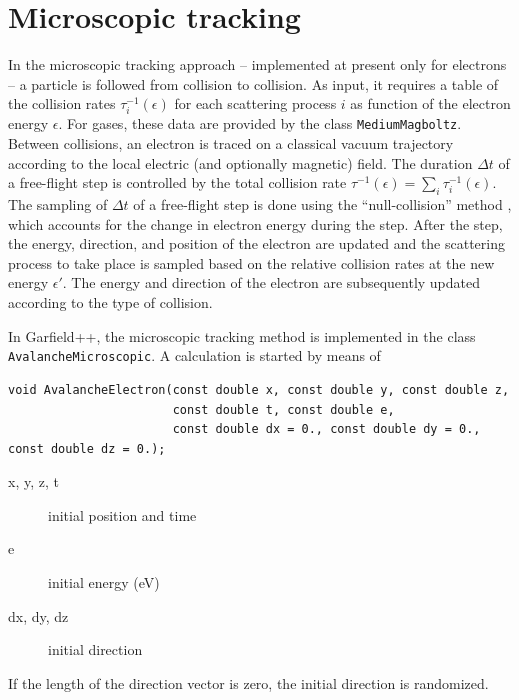 \section{Microscopic tracking}\label{Sec:MicroscopicTracking}
In the microscopic tracking approach -- implemented at present only for electrons --
a particle is followed from collision to collision. As input, it requires 
a table of the collision rates $\tau^{-1}_{i}\left(\epsilon\right)$ for each 
scattering process $i$ as function of the electron energy $\epsilon$. 
For gases, these data are provided by the class \texttt{MediumMagboltz}.
Between collisions, an electron is traced on a classical vacuum trajectory 
according to the local electric (and optionally magnetic) field. 
The duration $\Delta{t}$ of a free-flight step is controlled by the 
total collision rate 
$\tau^{-1}\left(\epsilon\right) = 
\sum_{i}\tau^{-1}_{i}\left(\epsilon\right)$.
The sampling of $\Delta{t}$ of a free-flight step is done using the 
``null-collision'' method \cite{Skullerud1968}, which accounts for 
the change in electron energy during the step. 
After the step, the energy, direction, and position of the electron 
are updated and the scattering process to take place is sampled based 
on the relative collision rates at the new energy $\epsilon'$.
The energy and direction of the electron are subsequently updated 
according to the type of collision.

In Garfield++, the microscopic tracking method is implemented in the class 
\texttt{AvalancheMicroscopic}. A calculation is started by means of
\begin{lstlisting}
void AvalancheElectron(const double x, const double y, const double z,
                       const double t, const double e,
                       const double dx = 0., const double dy = 0., const double dz = 0.);
\end{lstlisting}
\begin{description}
  \item[x, y, z, t] initial position and time
  \item[e] initial energy (eV)
  \item[dx, dy, dz] initial direction 
\end{description}
If the length of the direction vector is zero, 
the initial direction is randomized.


